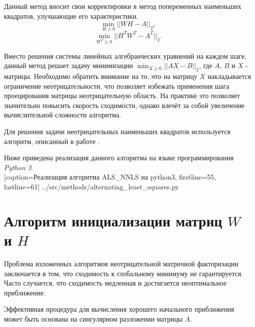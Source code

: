 Данный метод вносит свои корректировки в метод попеременных наименьших квадратов,
улучшающие его характеристики.
\begin{equation}
  \min_{H \geq 0}||WH - A||_2,
\end{equation}
\begin{equation}
  \min_{W^T \geq 0}||H^TW^T - A^T||_2.
\end{equation}

Вместо решения системы линейных алгебраических уравнений на каждом шаге,
данный метод решает задачу минимизации $\displaystyle\min_{X \geq 0}||AX - B||_2$, где $A$, $B$ и $X$ - матрицы.
Необходимо обратить внимание на то, что на матрицу $X$ накладывается ограничение неотрицательности,
что позволяет избежать применения шага проецирования матрицы неотрицательную область.
На практике это позволяет значительно повысить скорость сходимости,
однако влечёт за собой увеличение вычислительной сложности алгоритма.

Для решения задачи неотрицательных наименьших квадратов используется алгоритм, описанный в работе \cite{nnls}.

\newpage

Ниже приведена реализация данного алгоритма на языке программирования \textit{Python 3}.
\\


  [caption=Реализация алгоритма ALS\_NNLS на python3, firstline=55, lastline=61]
  {../src/methods/alternating_least_squares.py}





\newpage





\section{Алгоритм инициализации матриц $W$ и $H$}

Проблема изложенных алгоритмов неотрицательной матричной факторизации заключается в том,
что сходимость к глобальному минимуму не гарантируется.
Часто случается, что сходимость медленная и достигается неоптимальное приближение.

Эффективная процедура для вычисления хорошего начального приближения может быть основана на сингулярном разложении матрицы $A$.

